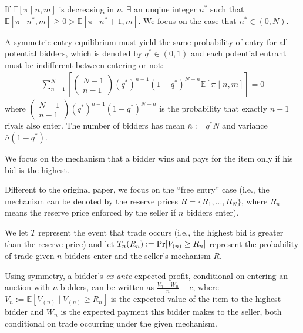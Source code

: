 \documentclass[11pt]{elegantbook}
\begin{document}
If $\mathbb{E}[\pi\mid n,m]$ is decreasing in $n$, $\exists$ an unqiue integer $n^*$ such that $\mathbb{E}[\pi\mid n^*,m]\geq 0>\mathbb{E}[\pi\mid n^*+1,m]$. We focus on the case that $n^*\in (0,N)$.

A symmetric entry equilibrium must yield the same probability of entry for all potential bidders, which is denoted by $q^*\in (0,1)$ and each potential entrant must be indifferent between entering or not:
\begin{equation}
    \begin{aligned}
        \sum_{n=1}^N\left[
            \begin{pmatrix}
            N-1\\
            n-1
        \end{pmatrix}
        (q^*)^{n-1}(1-q^*)^{N-n}\mathbb{E}[\pi\mid n,m]
        \right]=0
    \end{aligned}
    \label{EAE_1}
\end{equation}
where $\begin{pmatrix}N-1\\n-1\end{pmatrix}(q^*)^{n-1}(1-q^*)^{N-n}$ is the probability that exactly $n-1$ rivals also enter. The number of bidders has mean $\bar{n}:=q^*N$ and variance $\bar{n}(1-q^*)$.

We focus on the mechanism that a bidder wins and pays for the item only if his bid is the highest.
\begin{note}
    Different to the original paper, we focus on the ``free entry'' case (i.e., the mechanism can be denoted by the reserve prices $R=\{R_1,...,R_N\}$, where $R_n$ means the reserve price enforced by the seller if $n$ bidders enter).
\end{note}
We let $T$ represent the event that trade occurs (i.e., the highest bid is greater than the reserve price) and let $T_n(R_n):=\textnormal{Pr}[V_{(n)}\geq R_n]$ represent the probability of trade given $n$ bidders enter and the seller's mechanism $R$.

Using symmetry, a bidder's \textit{ex-ante} expected profit, conditional on entering an auction with $n$ bidders, can be written as $\frac{V_n-W_n}{n}-c$, where $V_n:=\mathbb{E}[V_{(n)}\mid V_{(n)}\geq R_n]$ is the expected value of the item to the highest bidder and $W_n$ is the expected payment this bidder makes to the seller, both conditional on trade occurring under the given mechanism.
\end{document}
